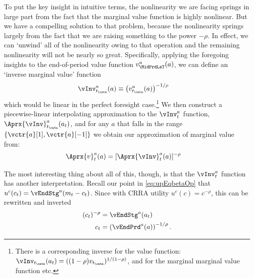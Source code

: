 \documentclass[titlepage, headings=optiontotocandhead]{econtex}
\begin{document}
To put the key insight in intuitive terms, the nonlinearity we are facing springs in large part from the fact that the marginal value function is highly nonlinear.  But we have a compelling solution to that problem, because the nonlinearity springs largely from the fact that we are raising something to the power $-\rho$.  In effect, we can `unwind' all of the nonlinearity owing to that operation and the remaining nonlinearity will not be nearly so great.  Specifically, applying the foregoing insights to the end-of-period value function $v^{a}_{\MidPrdLsT}(a)$, we can define an `inverse marginal value' function
\begin{equation}\begin{gathered}\begin{aligned}
      \vInv_{t_\cntn}^{a}(a)  & \equiv  \left(v^{a}_{t_\cntn}(a)\right)^{-1/\rho} \label{eq:cGoth}
    \end{aligned}\end{gathered}\end{equation}
which would be linear in the perfect foresight case.\footnote{There is a corresponding inverse for the value function: $\vInv_{t_\cntn}(a_{t})=((1-\rho)v_{t_\cntn})^{1/(1-\rho)}$, and for the marginal marginal value function etc.}  We then construct a piecewise-linear interpolating approximation to the $\vInv_{t}^{a}$ function, $\Aprx{\vInv}_{t_\cntn}^{a}(a_{t})$, and for any $a$ that falls in the range $\{\vctr{a}[1],\vctr{a}[-1]\}$ we obtain our approximation of marginal value from:
\begin{equation}\begin{gathered}\begin{aligned}
      \Aprx{v}_{t}^{a}(a) & =
      [\Aprx{\vInv}_{t}^{a}(a)]^{-\rho}
    \end{aligned}\end{gathered}\end{equation}

The most interesting thing about all of this, though, is that the $\vInv^{a}_{t}$ function has another interpretation. Recall our point in \eqref{eq:upEqbetaOp} that $u^{c}(c_{t}) = \vEndStg^{a}(m_{t}-c_{t})$.  Since with CRRA utility $u^{c}(c)=c^{-\rho}$, this can be rewritten
and inverted
\begin{equation}\begin{gathered}\begin{aligned}
      (c_{t})^{-\rho} & = \vEndStg^{a}(a_{t})
      \\ c_{t} & =      \left(\vEndPrd^{a}(a)\right)^{-1/\rho}.
    \end{aligned}\end{gathered}\end{equation}
\end{document}
